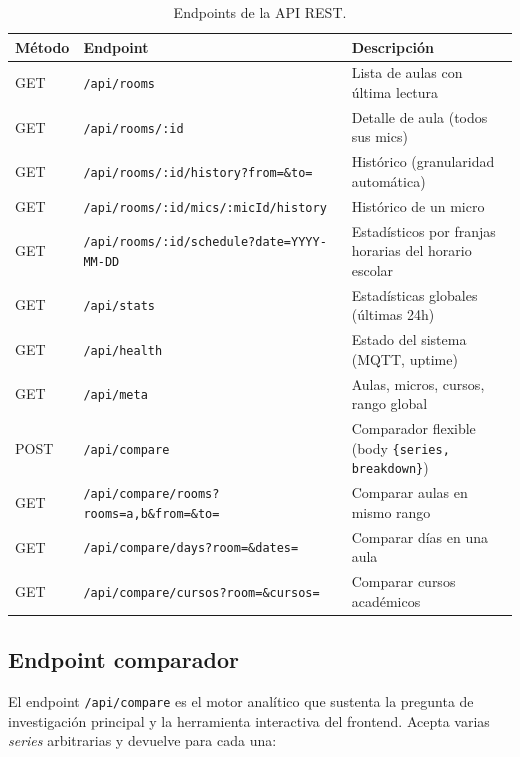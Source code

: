 \documentclass[11pt,a4paper,openany]{report}
\begin{document}
\begin{table}[H]
\centering
\footnotesize
{}
\begin{tabularx}{\textwidth}{l l X}
\toprule
\rowcolor{TableHead}
\textbf{M\'etodo} & \textbf{Endpoint} & \textbf{Descripci\'on} \\ \midrule
GET  & \texttt{/api/rooms}                                            & Lista de aulas con \'ultima lectura \\
GET  & \texttt{/api/rooms/:id}                                        & Detalle de aula (todos sus mics) \\
GET  & \texttt{/api/rooms/:id/history?from=\&to=}                     & Hist\'orico (granularidad autom\'atica) \\
GET  & \texttt{/api/rooms/:id/mics/:micId/history}                    & Hist\'orico de un micro \\
GET  & \texttt{/api/rooms/:id/schedule?date=YYYY-MM-DD}               & Estad\'isticos por franjas horarias del horario escolar \\
GET  & \texttt{/api/stats}                                            & Estad\'isticas globales (\'ultimas 24h) \\
GET  & \texttt{/api/health}                                           & Estado del sistema (MQTT, uptime) \\
GET  & \texttt{/api/meta}                                             & Aulas, micros, cursos, rango global \\
POST & \texttt{/api/compare}                                          & Comparador flexible (body \texttt{\{series, breakdown\}}) \\
GET  & \texttt{/api/compare/rooms?rooms=a,b\&from=\&to=}              & Comparar aulas en mismo rango \\
GET  & \texttt{/api/compare/days?room=\&dates=}                       & Comparar d\'ias en una aula \\
GET  & \texttt{/api/compare/cursos?room=\&cursos=}                    & Comparar cursos acad\'emicos \\ \bottomrule
\end{tabularx}
\caption{Endpoints de la API REST.}
\end{table}

\subsection{Endpoint comparador}

El endpoint \texttt{/api/compare} es el motor anal\'itico que sustenta la pregunta de investigaci\'on principal y la herramienta interactiva del frontend. Acepta varias \emph{series} arbitrarias y devuelve para cada una:
\end{document}
